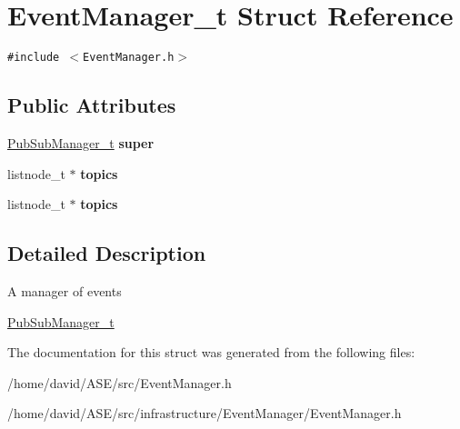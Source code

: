 \hypertarget{structEventManager__t}{
\section{EventManager\_\-t Struct Reference}
\label{structEventManager__t}
}
{\tt \#include $<$EventManager.h$>$}

\subsection*{Public Attributes}
\begin{CompactItemize}
\item 
\hypertarget{structEventManager__t_d6ab19e64bfdd71d76a3f7e9cbf1ccb5}{
\hyperlink{structPubSubManager__t}{PubSubManager\_\-t} \textbf{super}}
\label{structEventManager__t_d6ab19e64bfdd71d76a3f7e9cbf1ccb5}

\item 
\hypertarget{structEventManager__t_bcba73273dcc0d36ff047f22f6400d3d}{
listnode\_\-t $\ast$ \textbf{topics}}
\label{structEventManager__t_bcba73273dcc0d36ff047f22f6400d3d}

\item 
\hypertarget{structEventManager__t_bcba73273dcc0d36ff047f22f6400d3d}{
listnode\_\-t $\ast$ \textbf{topics}}
\label{structEventManager__t_bcba73273dcc0d36ff047f22f6400d3d}

\end{CompactItemize}


\subsection{Detailed Description}
A manager of events

\hyperlink{structPubSubManager__t}{PubSubManager\_\-t} 

The documentation for this struct was generated from the following files:\begin{CompactItemize}
\item 
/home/david/ASE/src/EventManager.h\item 
/home/david/ASE/src/infrastructure/EventManager/EventManager.h\end{CompactItemize}
